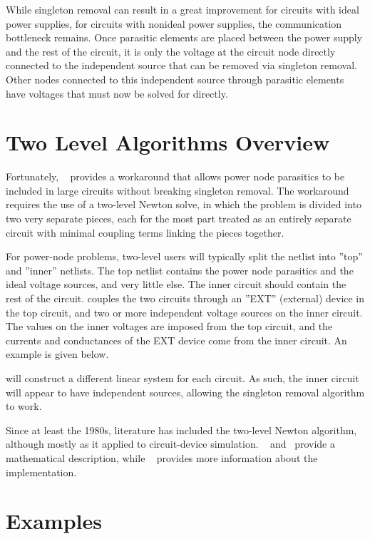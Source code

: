 While singleton removal can result in a great improvement for circuits with 
ideal power supplies, for circuits with nonideal power supplies, the 
communication bottleneck remains.   Once parasitic elements 
are placed between the power supply and the rest of the circuit, it is only 
the voltage at the circuit node directly connected to the independent
source that can be removed via singleton removal.  Other nodes connected to this independent source through parasitic elements have 
voltages that must now be solved for directly.  


\section{Two Level Algorithms Overview}
\label{twolevel_Overview}

Fortunately, \Xyce{}~\cite{xyceBookChapter:2011} provides a workaround 
that allows power node parasitics to be included in large circuits without breaking singleton 
removal.  The workaround requires the use of a two-level Newton solve,
in which the problem is divided into two very separate pieces, each
for the most part treated as an entirely separate circuit with minimal coupling terms linking the pieces together.  

For power-node problems, two-level users will typically split the netlist 
into ''top'' and ''inner'' netlists.  The top netlist contains the
power node parasitics and the ideal voltage sources, and very little else.
The inner circuit should contain the rest of the circuit.  \Xyce{} couples the two
circuits through an ''EXT'' (external) device in the top circuit,
and two or more independent voltage sources on the inner circuit.  The
values on the inner voltages are imposed from the top circuit, and
the currents and conductances of the EXT device come from the inner
circuit.  An example is given below.

\Xyce{} will construct a different linear system for each circuit. As such, the inner circuit will appear to have independent sources, allowing the singleton removal algorithm to work.

Since at least the 1980s, literature has included the two-level Newton algorithm, although mostly as it applied to 
circuit-device simulation.  ~\cite{twolevelnewton} and~\cite{Mayaram2} provide a mathematical description, while ~\cite{xyceBookChapter:2011} provides more information about the \Xyce{} implementation.

\section{Examples}
\label{twolevel_Examples}

